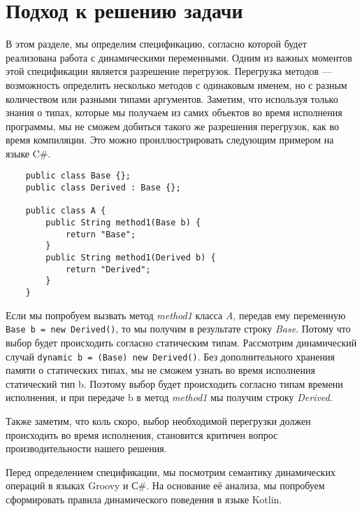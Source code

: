 \section{Подход к решению задачи}



В этом разделе, мы определим спецификацию, согласно которой будет реализована работа с динамическими переменными.  Одним из важных моментов этой спецификации является разрешение перегрузок. Перегрузка методов --- возможность определить несколько методов с одинаковым именем, но с разным количеством или разными типами аргументов. 
Заметим, что используя только знания о типах, которые мы получаем из самих объектов во время исполнения программы, мы не сможем добиться такого же разрешения перегрузок, как во время компиляции. Это можно проиллюстрировать следующим примером на языке C{\#}.

\begin{verbatim}
    public class Base {};
    public class Derived : Base {};
    
    public class A {
        public String method1(Base b) {
            return "Base";
        }
        public String method1(Derived b) {
            return "Derived";
        }
    }
\end{verbatim}

Если мы попробуем вызвать метод \textit{method1} класса \textit{A}, передав ему переменную  \texttt{Base b = new Derived()}, то мы получим в результате строку \textit{Base}. Потому что выбор будет происходить согласно статическим типам. Рассмотрим динамический случай \texttt{dynamic b = (Base) new Derived()}.
Без дополнительного хранения памяти о статических типах, мы не сможем узнать во время исполнения статический тип b. Поэтому выбор будет происходить согласно типам времени исполнения, и при передаче b в метод \textit{method1} мы получим строку \textit{Derived}.

Также заметим, что коль скоро, выбор необходимой перегрузки должен происходить во время исполнения, становится критичен вопрос производительности нашего решения.

Перед определением спецификации, мы посмотрим семантику динамических операций в языках Groovy и С\#. На основание её анализа, мы попробуем сформировать правила динамического поведения в языке Kotlin.


